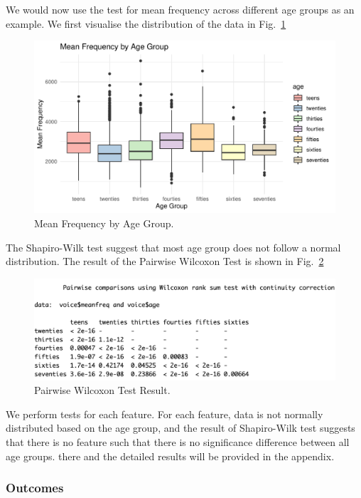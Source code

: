 \documentclass{article}
\begin{document}
	We would now use the test for mean frequency across different age groups as an example. We first visualise the distribution of the data in Fig.~\ref{meanfreq_age}
	\begin{figure}
		\centering
		\includegraphics[width=\textwidth]{graphs/age/mean_frequency_by_age_group.pdf}
		\caption{Mean Frequency by Age Group.}
		\label{meanfreq_age}
	\end{figure}
	The Shapiro-Wilk test suggest that most age group does not follow a normal distribution. The result of the Pairwise Wilcoxon Test is shown in Fig.~\ref{meanfreq_age_result}
	\begin{figure}
		\centering
		\includegraphics[width=\textwidth]{graphs/age/meanfreq_result.png}
		\caption{Pairwise Wilcoxon Test Result.}
		\label{meanfreq_age_result}
	\end{figure}
	
	We perform tests for each feature. For each feature, data is not normally distributed based on the age group, and the result of Shapiro-Wilk test suggests that there is no feature such that there is no significance difference between all age groups. there and the detailed results will be provided in the appendix.
	\subsubsection{Outcomes}
	
\end{document}
